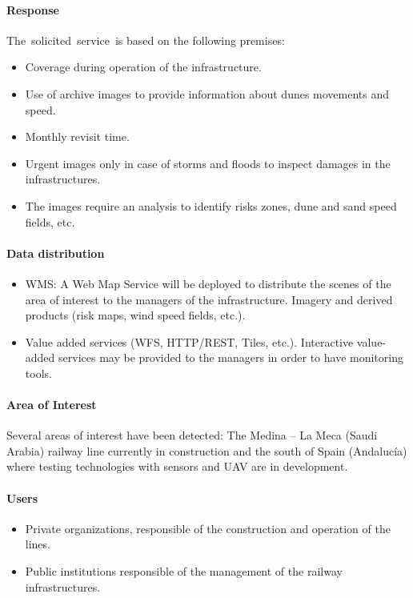 \documentclass[a4paper]{article}
\newcommand\liststyleLFOvii{%
\renewcommand\labelitemi{[F0B7?]}
\renewcommand\labelitemii{o}
\renewcommand\labelitemiii{[F0A7?]}
\renewcommand\labelitemiv{[F0B7?]}
}
\newcommand\liststyleLFOxiv{%
\renewcommand\labelitemi{[F0B7?]}
\renewcommand\labelitemii{o}
\renewcommand\labelitemiii{[F0A7?]}
\renewcommand\labelitemiv{[F0B7?]}
}
\newcommand\liststyleLFOxiii{%
\renewcommand\labelitemi{[F0B7?]}
\renewcommand\labelitemii{o}
\renewcommand\labelitemiii{[F0A7?]}
\renewcommand\labelitemiv{[F0B7?]}
}
\begin{document}
\paragraph[Response]{ Response}

\bigskip

{
The\ solicited\ service\ is based on the following premises:}

\liststyleLFOvii
\begin{itemize}
\item {
Coverage during operation of the infrastructure.}
\item {
Use of archive images to provide information about dunes movements and
speed.}
\item {
Monthly revisit time.}
\item {
Urgent images only in case of storms and floods to inspect damages in
the infrastructures.}
\item {
The images require an analysis to identify risks zones, dune and sand
speed fields, etc.}
\end{itemize}
\paragraph[Data distribution]{ Data
distribution}
\liststyleLFOxiv
\begin{itemize}
\item WMS: A Web Map Service will be deployed to distribute the scenes
of the area of interest to the managers of the infrastructure. Imagery
and derived products (risk maps, wind speed fields, etc.).\ 
\item Value added services (WFS, HTTP/REST, Tiles, etc.). Interactive
value-added services may be provided to the managers in order to have
monitoring tools.\ 
\end{itemize}
\paragraph[Area of Interest]{ Area of Interest}
{
Several areas of interest have been detected: The Medina -- La Meca
(Saudi Arabia) railway line currently in construction and the south of
Spain (Andaluc\'ia) where testing technologies with sensors and UAV are
in development.}

\paragraph[Users]{ Users}
\liststyleLFOxiii
\begin{itemize}
\item Private organizations, responsible of the construction and
operation of the lines.
\item Public institutions responsible of the management of the railway
infrastructures.
\end{itemize}
\end{document}
